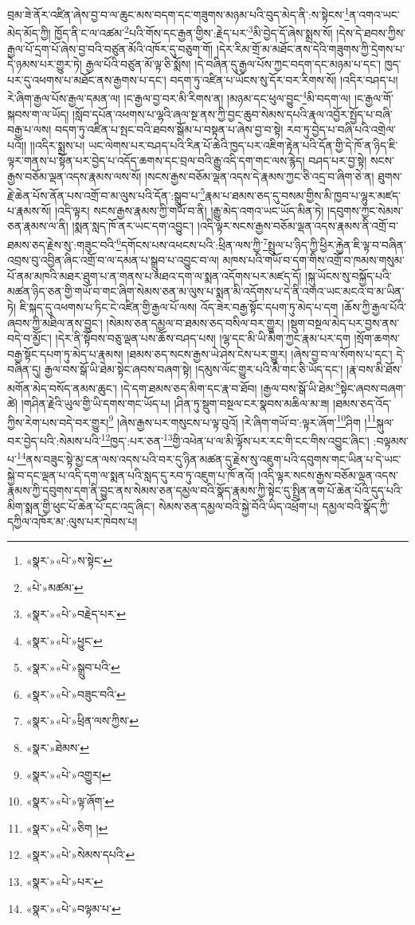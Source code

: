 བྲམ་ཟེ་ནོར་འཛིན་ཞེས་བྱ་བ་ལ་ཆུང་མས་བདག་དང་གཟུགས་མཉམ་པའི་བུད་མེད་ནི་:ས་སྟེངས་\footnote{«སྣར་»«པེ་»ས་སྟེང་}ན་འགའ་ཡང་མེད་མོད་ཀྱི། ཁྱོད་ནི་ང་ལ་འཚམ་\footnote{«པེ་»མཚམ་}པའི་གོས་དང་རྒྱན་གྱིས་:རྗེད་པར་\footnote{«སྣར་»«པེ་»བརྗེད་པར་}མི་བྱེད་དོ་ཞེས་སྨྲས་སོ། །དེས་དེ་ཐབས་ཀྱིས་རྒྱལ་པོ་དྲག་པོ་ཞེས་བྱ་བའི་བཙུན་མོའི་འཁོར་དུ་བཅུག་གོ། །དེར་རིམ་གྲོ་མ་མཐོང་ནས་དེའི་གཟུགས་ཀྱི་དྲེགས་པ་དེ་ཉམས་པར་གྱུར་ཏེ། རྒྱལ་པོའི་བཙུན་མོ་ལྟ་ཅི་སྨོས། །དེ་བཞིན་དུ་རྒྱལ་པོས་ཀྱང་བདག་དང་མཉམ་པ་དང་། ཁྱད་པར་དུ་འཕགས་པ་མཐོང་ནས་རྒྱགས་པ་དང་། བདག་ཏུ་འཛིན་པ་ཡོངས་སུ་དོར་བར་རིགས་སོ། །འདིར་བཤད་པ། རེ་ཞིག་རྒྱལ་པོས་རྒྱལ་དམན་ལ། །ང་རྒྱལ་བྱ་བར་མི་རིགས་ན། །མཉམ་དང་ཕུལ་བྱུང་\footnote{«སྣར་»«པེ་»ཕྱུང་}མི་བདག་ལ། །ང་རྒྱལ་གོ་སྐབས་ག་ལ་ཡོད། །སློབ་དཔོན་འཕགས་པ་ལྷའི་ཞལ་སྔ་ནས་ཀྱི་བྱང་ཆུབ་སེམས་དཔའི་རྣལ་འབྱོར་སྤྱོད་པ་བཞི་བརྒྱ་པ་ལས། བདག་ཏུ་འཛིན་པ་སྤང་བའི་ཐབས་སྒོམ་པ་བསྟན་པ་ཞེས་བྱ་བ་སྟེ། རབ་ཏུ་བྱེད་པ་བཞི་པའི་འགྲེལ་པའོ།། །།འདིར་སྨྲས་པ། ཡང་ལེགས་པར་བཤད་པའི་རིན་པོ་ཆེའི་ཁྱད་པར་འཇིག་རྟེན་པའི་དོན་གྱི་དེ་ཁོ་ན་ཉིད་ཇི་ལྟར་གནས་པ་སྟོན་པར་བྱེད་པ་འདོད་ཆགས་དང་བྲལ་བའི་རྒྱུ་འདི་དག་གང་ལས་རྙེད། བཤད་པར་བྱ་སྟེ། སངས་རྒྱས་བཅོམ་ལྡན་འདས་རྣམས་ལས་སོ། །སངས་རྒྱས་བཅོམ་ལྡན་འདས་དེ་རྣམས་ཀྱང་ཅི་འདྲ་བ་ཞིག་ཅེ་ན། ཐུགས་རྗེ་ཆེན་པོས་ནོན་པས་འགྲོ་བ་མ་ལུས་པའི་དོན་:སྒྲུབ་པ་\footnote{«སྣར་»«པེ་»སྒྲུབ་པའི་}རྣམ་པ་ཐམས་ཅད་དུ་བསམ་གྱིས་མི་ཁྱབ་པ་ལྷུར་མཛད་པ་རྣམས་སོ། །འདི་ལྟར། སངས་རྒྱས་རྣམས་ཀྱི་གཡོ་བ་ནི། །རྒྱུ་མེད་འགའ་ཡང་ཡོད་མིན་ཏེ། །དབུགས་ཀྱང་སེམས་ཅན་རྣམས་ལ་ནི། །སྨན་སླད་ཁོ་ནར་ཡང་དག་འབྱུང་། །འདི་ལྟར་སངས་རྒྱས་བཅོམ་ལྡན་འདས་རྣམས་ནི་འགྲོ་བ་ཐམས་ཅད་རྗེས་སུ་:གཟུང་བའི་\footnote{«སྣར་»«པེ་»བཟུང་བའི་}དགོངས་པས་འཕངས་པའི་:ཕྲིན་ལས་ཀྱི་\footnote{«སྣར་»«པེ་»ཕྲིན་ལས་ཀྱིས་}སྤྲུལ་པ་ཉིད་ཀྱི་ཕྱིར་རྐྱེན་ཇི་ལྟ་བ་བཞིན་འབྲས་བུ་འབྱིན་ཞིང་འགྲོ་བ་ལ་དམན་པ་སྒྲུབ་པ་འབྱུང་བ་ལ། མཁས་པའི་གཡོ་བ་དག་གིས་འགྲོ་བ་ཁམས་གསུམ་པོ་ནམ་མཁའི་མཐར་ཐུག་པ་ན་གནས་པ་མཐའ་དག་ལ་སྨན་འདོགས་པར་མཛད་དོ། །སྐུ་ཡོངས་སུ་བསྐྱོད་པའི་མཚན་ཉིད་ཅན་གྱི་གཡོ་བ་གང་ཞིག་སེམས་ཅན་མ་ལུས་པ་སྨན་མི་འདོགས་པ་དེ་ནི་འགའ་ཡང་མངའ་བ་མ་ཡིན་ཏེ། ཇི་སྐད་དུ་འཕགས་པ་ཏིང་ངེ་འཛིན་གྱི་རྒྱལ་པོ་ལས། འོད་ཟེར་བརྒྱ་སྟོང་དཔག་ཏུ་མེད་པ་དག །ཆོས་ཀྱི་རྒྱལ་པོའི་ཞབས་ཀྱི་མཐིལ་ནས་བྱུང་། །སེམས་ཅན་དམྱལ་བ་ཐམས་ཅད་བསིལ་བར་གྱུར། །སྡུག་བསྔལ་མེད་པར་བྱས་ནས་བདེ་བ་མྱོང་། །དེར་ནི་སྟོབས་བཅུ་ལྡན་པས་ཆོས་བཤད་པས། །ལྷ་དང་མི་ཡི་མིག་ཀྱང་རྣམ་པར་དག །སྲོག་ཆགས་བརྒྱ་སྟོང་དཔག་ཏུ་མེད་པ་རྣམས། །ཐམས་ཅད་སངས་རྒྱས་ཡེ་ཤེས་ངེས་པར་གྱུར། །ཞེས་བྱ་བ་ལ་སོགས་པ་དང་། དེ་བཞིན་དུ། རྒྱལ་བས་སྒོ་ཡི་ཐེམ་སྟེང་ཞབས་བཞག་སྟེ། །དམུས་ལོང་གྱུར་པའི་མི་གང་ཅི་ཡོད་དང་། །རྣ་བས་མི་ཐོས་མགོན་མེད་བསོད་ནམས་ཆུང་། །དེ་དག་ཐམས་ཅད་མིག་དང་རྣ་བ་ཐོབ། །རྒྱལ་བས་སྒོ་ཡི་ཐེམ་\footnote{«སྣར་»ཐེམས་}སྟེང་ཞབས་བཞག་ཚེ། །གཤིན་རྗེའི་ཡུལ་གྱི་ཡི་དགས་གང་ཡོད་པ། །ཤིན་ཏུ་སྡུག་བསྔལ་ངར་སྣབས་མཆིལ་མ་ཟ། །ཐམས་ཅད་འོད་ཀྱིས་རེག་པས་བདེ་བར་གྱུར།\footnote{«སྣར་»«པེ་»འགྱུར།} །ཞེས་རྒྱས་པར་གསུངས་པ་ལྟ་བུའོ། །རེ་ཞིག་གཡོ་བ་:ལྟར་ཞོག་\footnote{«སྣར་»«པེ་»ལྟ་ཞོག་}ཤིག །\footnote{«སྣར་»«པེ་»ཅིག །}སྐུལ་བར་བྱེད་པའི་:སེམས་པའི་\footnote{«སྣར་»«པེ་»སེམས་དཔའི་}ཁྱད་:པར་ཅན་\footnote{«སྣར་»«པེ་»པར་}གྱི་འཕེན་པ་ལ་མི་ལྟོས་པར་རང་གི་ངང་གིས་འབྱུང་ཞིང་། :བལྟམས་པ་\footnote{«སྣར་»«པེ་»བལྟམ་པ་}ནས་བཟུང་སྟེ་མྱ་ངན་ལས་འདས་པའི་བར་དུ་ཉིན་མཚན་དུ་རྗེས་སུ་འཇུག་པའི་དབུགས་གང་ཡིན་པ་དེ་ཡང་སྐྱེ་བ་དང་ལྡན་པ་འདི་དག་ལ་སྨན་པའི་སླད་དུ་རབ་ཏུ་འཇུག་པ་ཁོ་ནའོ། །འདི་ལྟར་སངས་རྒྱས་བཅོམ་ལྡན་འདས་རྣམས་ཀྱི་དབུགས་དག་ནི་བྱུང་ནས་སེམས་ཅན་དམྱལ་བའི་སྣོད་རྣམས་ཀྱི་སྟེང་དུ་སྤྲིན་ནག་པོ་ཆེན་པོའི་དུད་པའི་མིག་སྨན་གྱི་ཕུང་པོ་ཆེན་པོ་དང་འདྲ་ཞིང་། སེམས་ཅན་དམྱལ་བའི་སྐྱེ་བོའི་ཡིད་འཕྲོག་པ། དམྱལ་བའི་སྣོད་ཀྱི་དཀྱིལ་འཁོར་མ་:ལུས་པར་ཁེབས་པ། 